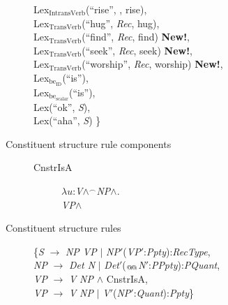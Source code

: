\begin{description}
\begin{tabbing}
\> Lex$_{\mathrm{IntransVerb}}$(``rise'', ,
rise), \\
\> Lex$_{\mathrm{TransVerb}}$(``hug'', \textit{Rec}, hug), \\
\> Lex$_{\mathrm{TransVerb}}$(``find'', \textit{Rec}, find)
\textbf{New!}, \\
\> Lex$_{\mathrm{TransVerb}}$(``seek'', \textit{Rec}, seek)
\textbf{New!}, \\
\> Lex$_{\mathrm{TransVerb}}$(``worship'', \textit{Rec}, worship) \textbf{New!}, \\
\> Lex$_{\mathrm{be}_{\text{ID}}}$(``is''), \\
\> Lex$_{\mathrm{be}_{\text{scalar}}}$(``is''), \\
\> Lex(``ok'', \textit{S}),  \\
\> Lex(``aha'', \textit{S})  \}
\end{tabbing}

\item[Constituent structure rule components] \mbox{} 
  \begin{description}

    \item[\textnormal{CnstrIsA}] \mbox{}

  $\lambda
u$:\textit{V}\d{$\wedge$}$^{\frown}$\textit{NP}\d{$\wedge$}. \\
\hspace*{1em} \textit{VP}\d{$\wedge$} 

  \end{description}
  


\item[Constituent structure rules] \mbox{}
  
  \begin{tabbing}
    \{\=\textit{S} $\longrightarrow$ \textit{NP VP} $\mid$ \textit{NP}$'$(\textit{VP}$'$:\textit{Ppty}):\textit{RecType},\\
    \>\textit{NP} $\longrightarrow$ \textit{Det N} $\mid$
    \textit{Det}$'$($_{\text{@\!@}}$\textit{N}$'$:\textit{PPpty}):\textit{PQuant},\\
    \>\textit{VP} $\longrightarrow$ \textit{V} \textit{NP}
    \d{\d{$\wedge$}} CnstrIsA, \\
    \>\textit{VP} $\longrightarrow$ \textit{V} \textit{NP} $\mid$
    \textit{V}$'$(\textit{NP}$'$:\textit{Quant}):\textit{Ppty}\}

  \end{tabbing}

\end{description}





